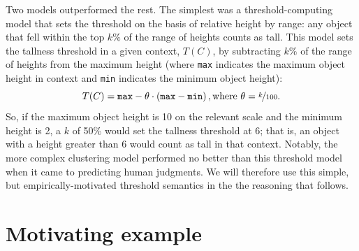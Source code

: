 \documentclass[10pt,a4paper]{article}
\begin{document}
Two models outperformed the rest. The simplest was a threshold-computing model that sets the threshold on the basis of relative height by range: any object that fell within the top $k\%$ of the range of heights counts as tall. This model sets the tallness threshold in a given context, $T(C)$, by subtracting $k\%$ of the range of heights from the maximum height (where \texttt{max} indicates the maximum object height in context and \texttt{min} indicates the minimum object height):
$$T(C) = \texttt{max} - \theta \cdot (\texttt{max} - \texttt{min})\,, \text{where $\theta = \nicefrac{k}{100}$.}$$
So, if the maximum object height is 10 on the relevant scale and the minimum height is 2, a $k$ of 50\% would set the tallness threshold at 6; that is, an object with a height greater than 6 would count as tall in that context. Notably, the more complex clustering model performed no better than this threshold model when it came to predicting human judgments.
We will therefore use this simple, but empirically-motivated threshold semantics in the the reasoning that follows.

%
%
%
%
%
%
%
%
%
%

\section{Motivating example}
\end{document}
